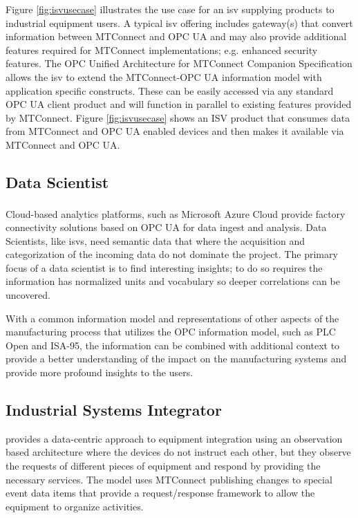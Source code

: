 Figure \ref{fig:isvusecase} illustrates the use case for an \gls{isv} supplying products to industrial equipment users. A typical \gls{isv} offering includes gateway(s) that convert information between MTConnect and OPC UA and may also provide additional features required for MTConnect implementations; e.g. enhanced security features. The OPC Unified Architecture for MTConnect Companion Specification allows the \gls{isv} to extend the MTConnect-OPC UA information model with application specific constructs. These can be easily accessed via any standard OPC UA client product and will function in parallel to existing features provided by MTConnect. Figure \ref{fig:isvusecase} shows an ISV product that consumes data from MTConnect and OPC UA enabled devices and then makes it available via MTConnect and OPC UA.


\FloatBarrier

\subsection{Data Scientist}

Cloud-based analytics platforms, such as Microsoft Azure\textsuperscript{\textregistered} Cloud provide factory connectivity solutions based on OPC UA for data ingest and analysis. Data Scientists, like \glspl{isv}, need semantic data that where the acquisition and categorization of the incoming data do not dominate the project. The primary focus of a data scientist is to find interesting insights; to do so requires the information has normalized units and vocabulary so deeper correlations can be uncovered. 

With a common information model and representations of other aspects of the manufacturing process that utilizes the OPC information model, such as PLC Open and ISA-95, the information can be combined with additional context to provide a better understanding of the impact on the manufacturing systems and provide more profound insights to the users.

\FloatBarrier

\subsection{Industrial Systems Integrator}

\cite{MTCPart5} provides a data-centric approach to equipment integration using an observation based architecture where the devices do not instruct each other, but they observe the requests of different pieces of equipment and respond by providing the necessary services. The model uses MTConnect publishing changes to special event data items that provide a request/response framework to allow the equipment to organize activities. 

